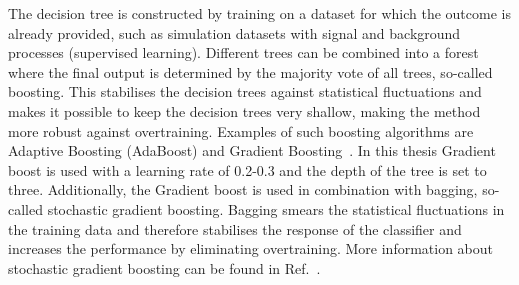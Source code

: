The decision tree is constructed by training on a dataset for which the outcome is already provided, such as simulation datasets with signal and background processes (supervised learning). Different trees can be combined into a forest where the final output is determined by the majority vote of all trees, so-called boosting. This stabilises the decision trees against statistical fluctuations and makes it possible to keep the decision trees very shallow, making the method more robust against overtraining. Examples of such boosting algorithms are Adaptive Boosting (AdaBoost) and Gradient Boosting~\cite{2014arXiv1403.1452M}.  In this thesis Gradient boost is used with a learning rate of 0.2-0.3 and the depth of the tree is set to three. Additionally, the Gradient boost is used in combination with bagging, so-called stochastic gradient boosting. Bagging smears the statistical fluctuations in the training data and therefore  stabilises the response of the classifier and increases the performance by eliminating overtraining.  More information about stochastic gradient boosting can be found in Ref.~\cite{Behnke:2013:DAH:2564838}.%


